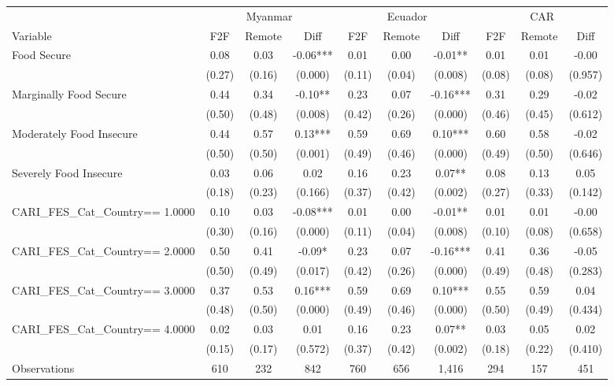 \begin{tabular}{l*{9}c}
\hline\hline
 & \multicolumn{3}{c}{Myanmar} & \multicolumn{3}{c}{Ecuador} & \multicolumn{3}{c}{CAR}\\ 
Variable & F2F & Remote & Diff & F2F & Remote & Diff & F2F & Remote & Diff \\
\hline
Food Secure&0.08&0.03&-0.06***&0.01&0.00&-0.01**&0.01&0.01&-0.00\\
&(0.27)&(0.16)&(0.000)&(0.11)&(0.04)&(0.008)&(0.08)&(0.08)&(0.957)\\
Marginally Food Secure&0.44&0.34&-0.10**&0.23&0.07&-0.16***&0.31&0.29&-0.02\\
&(0.50)&(0.48)&(0.008)&(0.42)&(0.26)&(0.000)&(0.46)&(0.45)&(0.612)\\
Moderately Food Insecure&0.44&0.57&0.13***&0.59&0.69&0.10***&0.60&0.58&-0.02\\
&(0.50)&(0.50)&(0.001)&(0.49)&(0.46)&(0.000)&(0.49)&(0.50)&(0.646)\\
Severely Food Insecure&0.03&0.06&0.02&0.16&0.23&0.07**&0.08&0.13&0.05\\
&(0.18)&(0.23)&(0.166)&(0.37)&(0.42)&(0.002)&(0.27)&(0.33)&(0.142)\\
CARI\_FES\_Cat\_Country==     1.0000&0.10&0.03&-0.08***&0.01&0.00&-0.01**&0.01&0.01&-0.00\\
&(0.30)&(0.16)&(0.000)&(0.11)&(0.04)&(0.008)&(0.10)&(0.08)&(0.658)\\
CARI\_FES\_Cat\_Country==     2.0000&0.50&0.41&-0.09*&0.23&0.07&-0.16***&0.41&0.36&-0.05\\
&(0.50)&(0.49)&(0.017)&(0.42)&(0.26)&(0.000)&(0.49)&(0.48)&(0.283)\\
CARI\_FES\_Cat\_Country==     3.0000&0.37&0.53&0.16***&0.59&0.69&0.10***&0.55&0.59&0.04\\
&(0.48)&(0.50)&(0.000)&(0.49)&(0.46)&(0.000)&(0.50)&(0.49)&(0.434)\\
CARI\_FES\_Cat\_Country==     4.0000&0.02&0.03&0.01&0.16&0.23&0.07**&0.03&0.05&0.02\\
&(0.15)&(0.17)&(0.572)&(0.37)&(0.42)&(0.002)&(0.18)&(0.22)&(0.410)\\
\hline
Observations & 610 & 232 & 842 & 760 & 656 & 1,416 & 294 & 157 & 451 \\
\hline\hline
\end{tabular}
